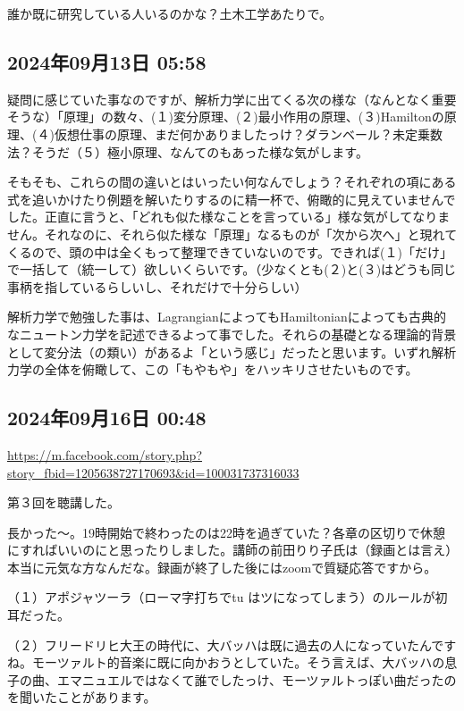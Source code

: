 誰か既に研究している人いるのかな？土木工学あたりで。

\subsection*{2024年09月13日 05:58}

疑問に感じていた事なのですが、解析力学に出てくる次の様な（なんとなく重要そうな）「原理」の数々、(１)変分原理、(２)最小作用の原理、(３)Hamiltonの原理、(４)仮想仕事の原理、まだ何かありましたっけ？ダランベール？未定乗数法？そうだ（５）極小原理、なんてのもあった様な気がします。

そもそも、これらの間の違いとはいったい何なんでしょう？それぞれの項にある式を追いかけたり例題を解いたりするのに精一杯で、俯瞰的に見えていませんでした。正直に言うと、「どれも似た様なことを言っている」様な気がしてなりません。それなのに、それら似た様な「原理」なるものが「次から次へ」と現れてくるので、頭の中は全くもって整理できていないのです。できれば(１)「だけ」で一括して（統一して）欲しいくらいです。（少なくとも(２)と(３)はどうも同じ事柄を指しているらしいし、それだけで十分らしい）

解析力学で勉強した事は、LagrangianによってもHamiltonianによっても古典的なニュートン力学を記述できるよって事でした。それらの基礎となる理論的背景として変分法（の類い）があるよ「という感じ」だったと思います。いずれ解析力学の全体を俯瞰して、この「もやもや」をハッキリさせたいものです。

\subsection*{2024年09月16日 00:48}

\url{https://m.facebook.com/story.php?story_fbid=1205638727170693&id=100031737316033}

第３回を聴講した。

長かった〜。19時開始で終わったのは22時を過ぎていた？各章の区切りで休憩にすればいいのにと思ったりしました。講師の前田りり子氏は（録画とは言え）本当に元気な方なんだな。録画が終了した後にはzoomで質疑応答ですから。

（１）アポジャツーラ（ローマ字打ちでtu はツになってしまう）のルールが初耳だった。

（２）フリードリヒ大王の時代に、大バッハは既に過去の人になっていたんですね。モーツァルト的音楽に既に向かおうとしていた。そう言えば、大バッハの息子の曲、エマニュエルではなくて誰でしたっけ、モーツァルトっぽい曲だったのを聞いたことがあります。

